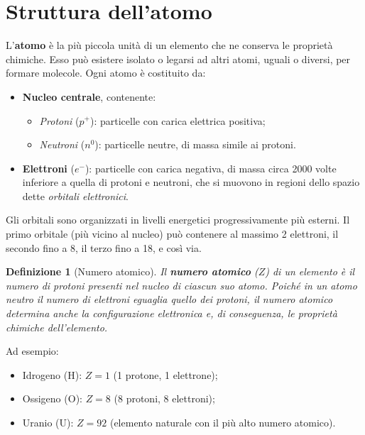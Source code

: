 \documentclass[12pt,a4paper]{report}
\newtheorem{definizione}{Definizione}[section]
\begin{document}
\section{Struttura dell'atomo}
L'\textbf{atomo} è la più piccola unità di un elemento che ne conserva le proprietà chimiche. Esso può esistere isolato o legarsi ad altri atomi, uguali o diversi, per formare molecole.
Ogni atomo è costituito da:
\begin{itemize}
\item \textbf{Nucleo centrale}, contenente:
\begin{itemize}
    \item \textit{Protoni} (\(p^+\)): particelle con carica elettrica positiva;
    \item \textit{Neutroni} (\(n^0\)): particelle neutre, di massa simile ai protoni.
\end{itemize}
\item \textbf{Elettroni} (\(e^-\)): particelle con carica negativa, di massa circa 2000 volte inferiore a quella di protoni e neutroni, che si muovono in regioni dello spazio dette \textit{orbitali elettronici}.
\end{itemize}
Gli orbitali sono organizzati in livelli energetici progressivamente più esterni. Il primo orbitale (più vicino al nucleo) può contenere al massimo 2 elettroni, il secondo fino a 8, il terzo fino a 18, e così via.
\begin{definizione}[Numero atomico]
Il \textbf{numero atomico} (\(Z\)) di un elemento è il numero di protoni presenti nel nucleo di ciascun suo atomo. Poiché in un atomo neutro il numero di elettroni eguaglia quello dei protoni, il numero atomico determina anche la configurazione elettronica e, di conseguenza, le proprietà chimiche dell'elemento.
\end{definizione}
Ad esempio:
\begin{itemize}
\item Idrogeno (\(\mathrm{H}\)): \(Z = 1\) (1 protone, 1 elettrone);
\item Ossigeno (\(\mathrm{O}\)): \(Z = 8\) (8 protoni, 8 elettroni);
\item Uranio (\(\mathrm{U}\)): \(Z = 92\) (elemento naturale con il più alto numero atomico).
\end{itemize}
\end{document}
